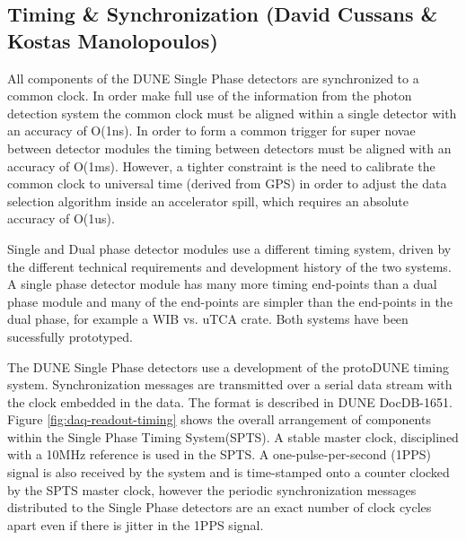 	


%

%
%
%

\subsection{Timing \& Synchronization (David Cussans \& Kostas Manolopoulos)}
\label{sec:fdsp-daq-timing}


All components of the DUNE Single Phase detectors are synchronized to
a common clock. In order make full use of the information from the
photon detection system the common clock must be aligned within a
single detector with an accuracy of O(1ns). In order to form a common
trigger for super novae between detector modules the timing between
detectors must be aligned with an accuracy of O(1ms). However, a
tighter constraint is the need to calibrate the common clock to
universal time (derived from GPS) in order to adjust the data
selection algorithm inside an accelerator spill, which requires an
absolute accuracy of O(1us).

Single and Dual phase detector modules use a different timing system,
driven by the different technical requirements and development history
of the two systems. A single phase detector module has many more
timing end-points than a dual phase module and many of the end-points
are simpler than the end-points in the dual phase, for example a WIB
vs. uTCA crate. Both systems have been sucessfully prototyped.

The DUNE Single Phase detectors use a development of the protoDUNE
timing system. Synchronization messages are transmitted over a serial
data stream with the clock embedded in the data. The format is
described in DUNE DocDB-1651. Figure \ref{fig:daq-readout-timing}
shows the overall arrangement of components within the Single Phase
Timing System(SPTS). A stable master clock, disciplined with a 10MHz
reference is used in the SPTS. A one-pulse-per-second (1PPS) signal is
also received by the system and is time-stamped onto a counter clocked
by the SPTS master clock, however the periodic synchronization
messages distributed to the Single Phase detectors are an exact number
of clock cycles apart even if there is jitter in the 1PPS signal.

